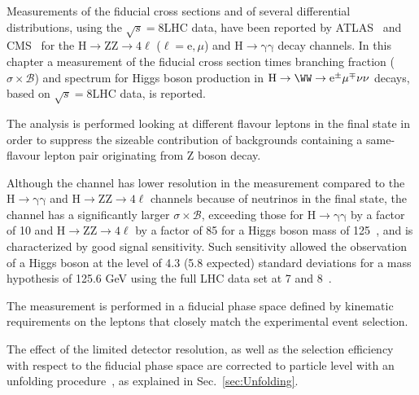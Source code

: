 Measurements of the fiducial cross sections and of several differential
distributions, using the $\sqrt{s}=8$\TeV LHC data, have been reported by ATLAS~\cite{Aad:2014tca,Aad:2014lwa,Aad:2015lha} and CMS~\cite{Khachatryan:2015rxa,Khachatryan:2015yvw} for the $\mathrm{H \to ZZ \to 4\ell}$ ($\ell = \mathrm{e},\mu$) and $\mathrm{H \to \gamma\gamma}$ decay channels. In this chapter a measurement of the fiducial cross section times branching fraction ($\sigma \times \mathcal{B}$) and \pt spectrum for Higgs boson production in $\mathrm{H \to \WW \to e^{\pm} \mu^{\mp}\nu\nu}$ decays, based on $\sqrt{s} = 8$\TeV LHC data, is reported.

The analysis is performed looking at different flavour leptons in the final state in order to suppress the sizeable contribution of backgrounds containing a same-flavour lepton pair originating from Z boson decay.

Although the \hwwllnn channel has lower resolution in the \pth measurement
compared to the $\mathrm{H\to \gamma\gamma}$ and $\mathrm{H\to ZZ\to 4\ell}$ channels
because of neutrinos in the final state, the channel has a significantly
larger $\sigma \times \mathcal{B}$, exceeding those for $\mathrm{H\to \gamma\gamma}$ by a factor
of 10 and $\mathrm{H\to ZZ\to 4\ell}$ by a factor of 85 for a Higgs boson mass of
125\GeV~\cite{Heinemeyer:2013tqa}, and is characterized by good signal
sensitivity. Such sensitivity allowed the observation of a Higgs boson at the level of 4.3 (5.8 expected)
standard deviations for a mass hypothesis of 125.6 GeV using the full LHC data set at 7 and 8\TeV~\cite{Chatrchyan:2013iaa}.

The measurement is performed in a fiducial phase space defined by kinematic requirements on
the leptons that closely match the experimental event selection.

The effect of the limited detector resolution, as well as the
selection efficiency with respect to the fiducial phase space are corrected to
particle level with an unfolding procedure~\cite{Cowan:2002in}, as explained in Sec.~\ref{sec:Unfolding}.


